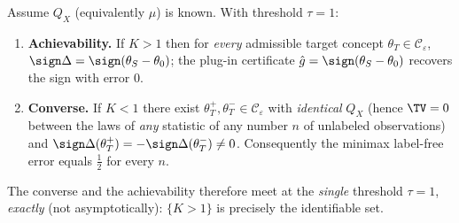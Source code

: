 \begin{theorem}[Population knowability--capacity, $\tau=1$]\label{thm:knowcap}
Assume $Q_X$ (equivalently $\mu$) is known. With threshold $\tau=1$:
\begin{enumerate}\itemsep1pt
\item[\textnormal{(i)}] \textbf{Achievability.} If $K>1$ then for \emph{every}
admissible target concept $\theta_T\in\mathcal C_\varepsilon$,
$\sign\Delta=\sign(\theta_S-\theta_0)$; the plug-in certificate
$\hat g=\sign(\theta_S-\theta_0)$ recovers the sign with error $0$.
\item[\textnormal{(ii)}] \textbf{Converse.} If $K<1$ there exist
$\theta_T^+,\theta_T^-\in\mathcal C_\varepsilon$ with \emph{identical} $Q_X$ (hence
$\TV=0$ between the laws of \emph{any} statistic of any number $n$ of unlabeled
observations) and $\sign\Delta(\theta_T^+)=-\sign\Delta(\theta_T^-)\neq0$.
Consequently the minimax label-free error equals $\tfrac12$ for every $n$.
\end{enumerate}
The converse and the achievability therefore meet at the \emph{single} threshold
$\tau=1$, \emph{exactly} (not asymptotically): $\{K>1\}$ is precisely the
identifiable set.
\end{theorem}
